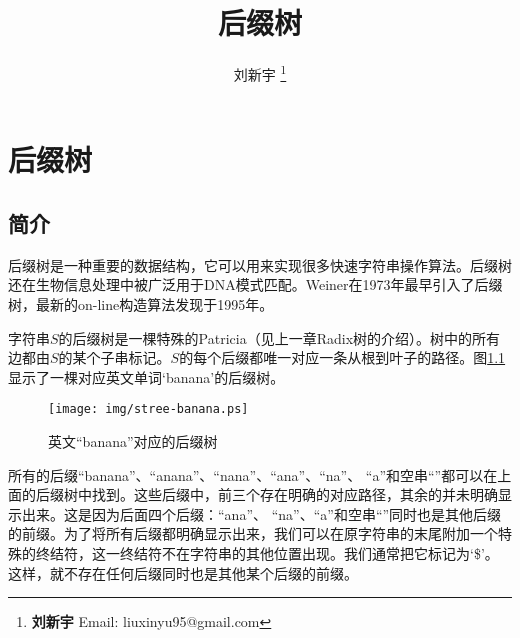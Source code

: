 \documentclass{ctexart}
\begin{document}


\title{后缀树}

\author{刘新宇
\thanks{{\bfseries 刘新宇 } \newline
  Email: liuxinyu95@gmail.com \newline}
  }

\maketitle
\fi


\ifx\wholebook\relax
\chapter{后缀树}
\fi


\section{简介}
\label{introduction}

后缀树是一种重要的数据结构，它可以用来实现很多快速字符串操作算法\cite{wiki-suffix-tree}。后缀树还在生物信息处理中被广泛用于DNA模式匹配\cite{ukkonen-presentation}。Weiner在1973年最早引入了后缀树\cite{weiner73}，最新的on-line构造算法发现于1995年\cite{ukkonen95}。

字符串$S$的后缀树是一棵特殊的Patricia（见上一章Radix树的介绍）。树中的所有边都由$S$的某个子串标记。$S$的每个后缀都唯一对应一条从根到叶子的路径。图\ref{fig:stree-banana}显示了一棵对应英文单词‘banana’的后缀树。

\begin{figure}[htbp]
  \centering
  \texttt{[image: img/stree-banana.ps]}
  \caption{英文“banana”对应的后缀树} \label{fig:stree-banana}
\end{figure}

所有的后缀“banana”、“anana”、“nana”、“ana”、“na”、
“a”和空串“”都可以在上面的后缀树中找到。这些后缀中，前三个存在明确的对应路径，其余的并未明确显示出来。这是因为后面四个后缀：“ana”、
“na”、“a”和空串“”同时也是其他后缀的前缀。为了将所有后缀都明确显示出来，我们可以在原字符串的末尾附加一个特殊的终结符，这一终结符不在字符串的其他位置出现。我们通常把它标记为‘\$’。这样，就不存在任何后缀同时也是其他某个后缀的前缀。
\end{document}
